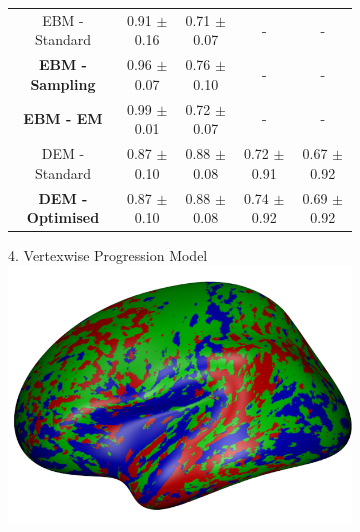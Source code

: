 \documentclass[10pt,xcolor=table]{beamer}
\begin{document}
\begin{frame}
\begin{figure}
\begin{subfigure}{0.47\textwidth}
{\begin{tabular}{c | c | c | c | c}
  \hline
  EBM - Standard & 0.91 $\pm$ 0.16 & 0.71 $\pm$ 0.07 & - & -\\
  \textbf{EBM - Sampling} & 0.96 $\pm$ 0.07 & 0.76 $\pm$ 0.10 & - & -\\
  \textbf{EBM - EM} & 0.99 $\pm$ 0.01 & 0.72 $\pm$ 0.07 & - & -\\
  DEM - Standard & 0.87 $\pm$ 0.10 & 0.88 $\pm$ 0.08 & 0.72 $\pm$ 0.91 & 0.67 $\pm$ 0.92\\
  \textbf{DEM - Optimised} & 0.87 $\pm$ 0.10 & 0.88 $\pm$ 0.08 & 0.74 $\pm$ 0.92 & 0.69 $\pm$ 0.92\\
  
 \end{tabular}
 }

\end{subfigure}
\begin{subfigure}{0.47\textwidth}
\centering
\vspace{2em}
{
4. Vertexwise Progression Model\\
\includegraphics[width=0.5\columnwidth]{../images/vwdpm/blend14_adniThavgFWHM0InithistCl3Pr0Ra1_VWDPMStd.png}
}
\end{subfigure}

\end{figure}

\vspace{-1em}


\end{frame}
\end{document}
